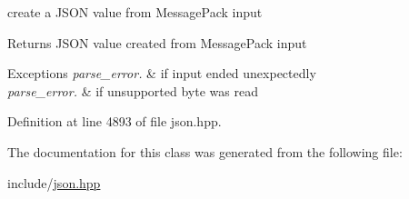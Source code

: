 create a J\+S\+ON value from Message\+Pack input 

\begin{DoxyReturn}{Returns}
J\+S\+ON value created from Message\+Pack input
\end{DoxyReturn}

\begin{DoxyExceptions}{Exceptions}
{\em parse\+\_\+error.} & if input ended unexpectedly \\
\hline
{\em parse\+\_\+error.} & if unsupported byte was read \\
\hline
\end{DoxyExceptions}


Definition at line 4893 of file json.\+hpp.



The documentation for this class was generated from the following file\+:\begin{DoxyCompactItemize}
\item 
include/\hyperlink{json_8hpp}{json.\+hpp}\end{DoxyCompactItemize}
